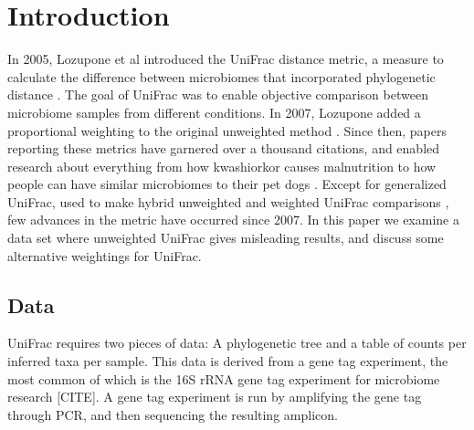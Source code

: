 \documentclass[10pt,letterpaper]{article}
\begin{document}

\linenumbers

\section*{Introduction}
In 2005, Lozupone et al introduced the UniFrac distance metric, a measure to calculate the difference between microbiomes that incorporated phylogenetic distance \cite{lozupone2005unifrac}. The goal of UniFrac was to enable objective comparison between microbiome samples from different conditions. In 2007, Lozupone added a proportional weighting to the original unweighted method \cite{lozupone2007quantitative}. Since then, papers reporting these metrics have garnered over a thousand citations, and enabled research about everything from how kwashiorkor causes malnutrition \cite{smith2013gut} to how people can have similar microbiomes to their pet dogs \cite{song2013cohabiting}. Except for generalized UniFrac, used to make hybrid unweighted and weighted UniFrac comparisons \cite{chen2012associating}, few advances in the metric have occurred since 2007. In this paper we examine a data set where unweighted UniFrac gives misleading results, and discuss some alternative weightings for UniFrac.

\subsection{Data}
UniFrac requires two pieces of data: A phylogenetic tree and a table of counts per inferred taxa per sample. This data is derived from a gene tag experiment, the most common of which is the 16S rRNA gene tag experiment for microbiome research [CITE]. A gene tag experiment is run by amplifying the gene tag through PCR, and then sequencing the resulting amplicon.
\end{document}
